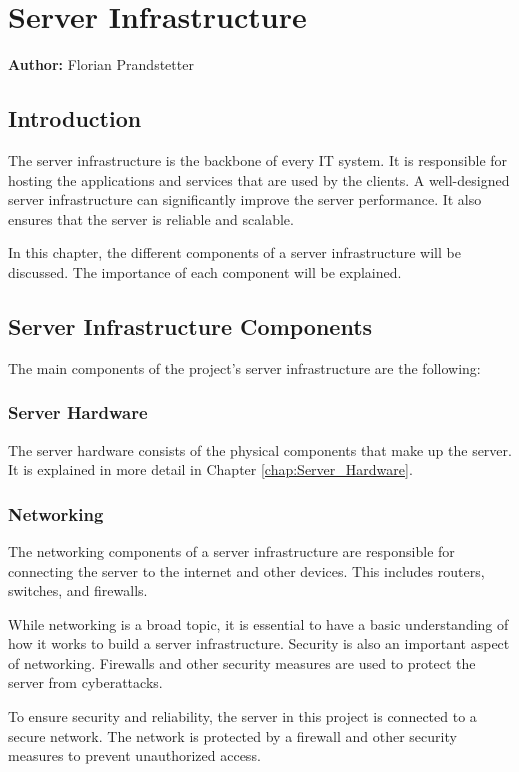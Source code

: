 \chapter{Server Infrastructure}
\label{chap:Server_Infrastructure}
\textbf{Author:} Florian Prandstetter


\section{Introduction}

The server infrastructure is the backbone of every IT system. It is responsible for hosting the applications and services that are used by the clients.
A well-designed server infrastructure can significantly improve the server performance. It also ensures that the server is reliable and scalable.

In this chapter, the different components of a server infrastructure will be discussed. The importance of each component will be explained.

\section{Server Infrastructure Components}

The main components of the project's server infrastructure are the following:

\subsection{Server Hardware}

The server hardware consists of the physical components that make up the server. 
It is explained in more detail in Chapter \ref{chap:Server_Hardware}.

\subsection{Networking}

The networking components of a server infrastructure are responsible for connecting the server to the internet and other devices.
This includes routers, switches, and firewalls.

While networking is a broad topic, it is essential to have a basic understanding of how it works to build a server infrastructure.
Security is also an important aspect of networking. Firewalls and other security measures are used to protect the server from cyberattacks. 

To ensure security and reliability, the server in this project is connected to a secure network. The network is protected by a firewall and other security measures to prevent unauthorized access.



